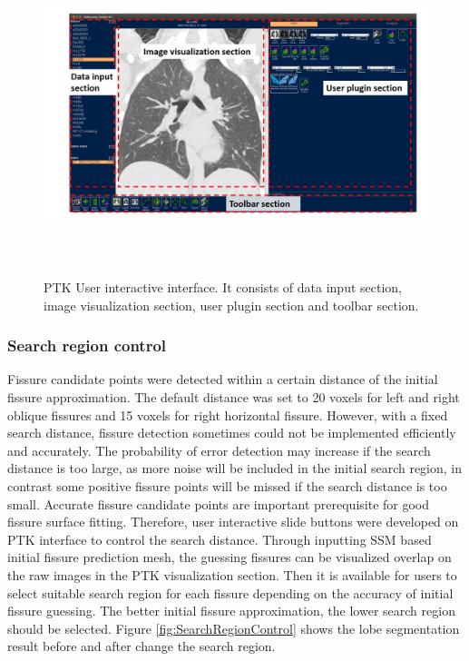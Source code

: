 {\begin{figure}[htbp]
  \flushleft 
  \includegraphics[height=3.65in]{Segmentation/Image/PTKUserInterface.jpg}
  \caption{PTK User interactive interface. It consists of data input section, image visualization section, user plugin section and toolbar section.}
  \label{fig:PTKUserInterface}
\end{figure}

\subsubsection{Search region control}
Fissure candidate points were detected within a certain distance of the initial fissure approximation. The default distance was set to 20 voxels for left and right oblique fissures and 15 voxels for right horizontal fissure. However, with a fixed search distance, fissure detection sometimes could not be implemented efficiently and accurately. The probability of error detection may increase if the search distance is too large, as more noise will be included in the initial search region, in contrast some positive fissure points will be missed if the search distance is too small. Accurate fissure candidate points are important prerequisite for good fissure surface fitting. Therefore, user interactive slide buttons were developed on PTK interface to control the search distance. Through inputting SSM based initial fissure prediction mesh, the guessing fissures can be  visualized overlap on the raw images in the PTK visualization section. Then it is available for users to select suitable search region for each fissure depending on the accuracy of initial fissure guessing. The  better initial fissure approximation, the lower search region should be selected. Figure \ref{fig:SearchRegionControl} shows the lobe segmentation result before and after change the search region.

}
